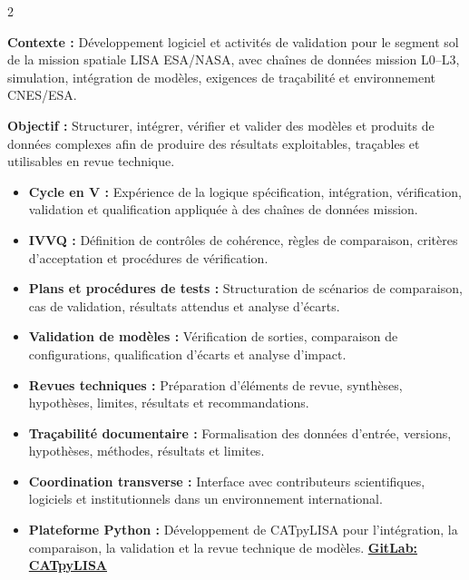 \documentclass[8pt,a4paper,ragged2e,withhyper]{altacv}
\begin{document}
\begin{paracol}{2}
\divider


\textbf{Contexte :} Développement logiciel et activités de validation pour le segment sol de la mission spatiale LISA ESA/NASA, avec chaînes de données mission L0--L3, simulation, intégration de modèles, exigences de traçabilité et environnement CNES/ESA.

\textbf{Objectif :} Structurer, intégrer, vérifier et valider des modèles et produits de données complexes afin de produire des résultats exploitables, traçables et utilisables en revue technique.

\begin{itemize}
  \item \textbf{Cycle en V :} Expérience de la logique spécification, intégration, vérification, validation et qualification appliquée à des chaînes de données mission.
  \item \textbf{IVVQ :} Définition de contrôles de cohérence, règles de comparaison, critères d’acceptation et procédures de vérification.
  \item \textbf{Plans et procédures de tests :} Structuration de scénarios de comparaison, cas de validation, résultats attendus et analyse d’écarts.
  \item \textbf{Validation de modèles :} Vérification de sorties, comparaison de configurations, qualification d’écarts et analyse d’impact.
  \item \textbf{Revues techniques :} Préparation d’éléments de revue, synthèses, hypothèses, limites, résultats et recommandations.
  \item \textbf{Traçabilité documentaire :} Formalisation des données d’entrée, versions, hypothèses, méthodes, résultats et limites.
  \item \textbf{Coordination transverse :} Interface avec contributeurs scientifiques, logiciels et institutionnels dans un environnement international.
  \item \textbf{Plateforme Python :} Développement de CATpyLISA pour l’intégration, la comparaison, la validation et la revue technique de modèles.
  \textcolor{DarkPastelRed}{\href{https://gitlab.oca.eu/gboileau/lisa_l3_tools}{\bf GitLab: CATpyLISA}}
\end{itemize}

\divider



\end{paracol}
\end{document}
